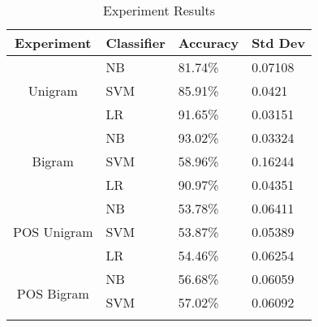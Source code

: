\documentclass[twocolumn]{article}
\begin{document}
\begin{table}[h]
\centering
\caption{Experiment Results}
\begin{tabular}{|c|l|l|l|}
\hline
\textbf{Experiment}           & \multicolumn{1}{c|}{\textbf{Classifier}} & \multicolumn{1}{c|}{\textbf{Accuracy}} & \multicolumn{1}{c|}{\textbf{Std Dev}} \\ \hline
\multirow{3}{*}{Unigram}      & NB                                       & 81.74\%                                & 0.07108                           \\ \cline{2-4}
                              & SVM                                      & 85.91\%                                & 0.0421                            \\ \cline{2-4}
                              & LR                                       & 91.65\%                                & 0.03151                           \\ \hline
\multirow{3}{*}{Bigram}       & NB                                       & 93.02\%                                & 0.03324                           \\ \cline{2-4}
                              & SVM                                      & 58.96\%                                & 0.16244                           \\ \cline{2-4}
                              & LR                                       & 90.97\%                                & 0.04351                           \\ \hline
\multirow{3}{*}{POS Unigram}  & NB                                       & 53.78\%                                & 0.06411                           \\ \cline{2-4}
                              & SVM                                      & 53.87\%                                & 0.05389                           \\ \cline{2-4}
                              & LR                                       & 54.46\%                                & 0.06254                           \\ \hline
\multirow{3}{*}{POS Bigram}   & NB                                       & 56.68\%                                & 0.06059                           \\ \cline{2-4}
                              & SVM                                      & 57.02\%                                & 0.06092                           \\ \cline{2-4}

\end{tabular}
\end{table}
\end{document}
